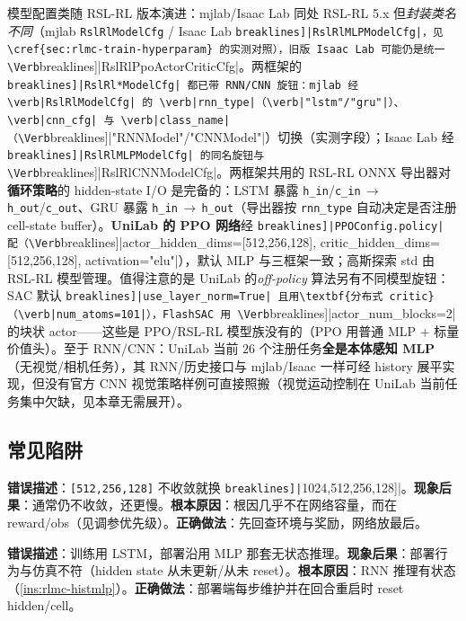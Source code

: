 模型配置类随 RSL-RL 版本演进：mjlab/Isaac Lab 同处 RSL-RL 5.x 但\emph{封装类名不同}（mjlab \verb|RslRlModelCfg| / Isaac Lab \Verb[breaklines]|RslRlMLPModelCfg|，见 \cref{sec:rlmc-train-hyperparam} 的实测对照），旧版 Isaac Lab 可能仍是统一 \Verb[breaklines]|RslRlPpoActorCriticCfg|。两框架的 \Verb[breaklines]|RslRl*ModelCfg| 都已带 RNN/CNN 旋钮：mjlab 经 \verb|RslRlModelCfg| 的 \verb|rnn_type|（\verb|"lstm"/"gru"|）、\verb|cnn_cfg| 与 \verb|class_name|（\Verb[breaklines]|"RNNModel"/"CNNModel"|）切换（实测字段）；Isaac Lab 经 \Verb[breaklines]|RslRlMLPModelCfg| 的同名旋钮与 \Verb[breaklines]|RslRlCNNModelCfg|。两框架共用的 RSL-RL ONNX 导出器对\textbf{循环策略}的 hidden-state I/O 是完备的：LSTM 暴露 \verb|h_in|/\allowbreak\verb|c_in|\,$\to$\,\verb|h_out|/\allowbreak\verb|c_out|、GRU 暴露 \verb|h_in|\,$\to$\,\verb|h_out|（导出器按 \verb|rnn_type| 自动决定是否注册 cell-state buffer）。\textbf{UniLab 的 PPO 网络}经 \Verb[breaklines]|PPOConfig.policy| 配（\Verb[breaklines]|actor_hidden_dims=[512,256,128], critic_hidden_dims=[512,256,128], activation="elu"|），默认 MLP 与三框架一致；高斯探索 std 由 RSL-RL 模型管理。值得注意的是 UniLab 的\emph{off-policy} 算法另有不同模型旋钮：SAC 默认 \Verb[breaklines]|use_layer_norm=True| 且用\textbf{分布式 critic}（\verb|num_atoms=101|），FlashSAC 用 \Verb[breaklines]|actor_num_blocks=2| 的块状 actor——这些是 PPO/RSL-RL 模型族没有的（PPO 用普通 MLP $+$ 标量价值头）。至于 RNN/CNN：UniLab 当前 $26$ 个注册任务\textbf{全是本体感知 MLP}（无视觉/相机任务），其 RNN/历史接口与 mjlab/Isaac 一样可经 history 展平实现，但没有官方 CNN 视觉策略样例可直接照搬（视觉运动控制在 UniLab 当前任务集中欠缺，见本章无需展开）。

\subsection{常见陷阱}

\begin{pitfall}[把网络改大来"修复"训练]
\textbf{错误描述}：\verb|[512,256,128]| 不收敛就换 \Verb[breaklines]|[1024,512,256,128]|。\textbf{现象后果}：通常仍不收敛，还更慢。\textbf{根本原因}：根因几乎不在网络容量，而在 reward/obs（见调参优先级）。\textbf{正确做法}：先回查环境与奖励，网络放最后。
\end{pitfall}

\begin{pitfall}
\textbf{错误描述}：训练用 LSTM，部署沿用 MLP 那套无状态推理。\textbf{现象后果}：部署行为与仿真不符（hidden state 从未更新/从未 reset）。\textbf{根本原因}：RNN 推理有状态（\cref{ins:rlmc-histmlp}）。\textbf{正确做法}：部署端每步维护并在回合重启时 reset hidden/cell。
\end{pitfall}

